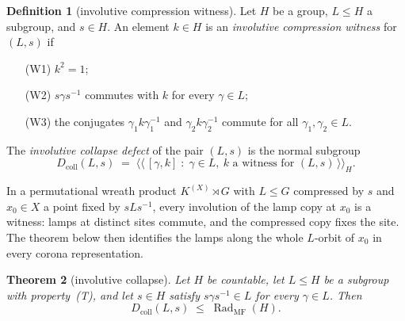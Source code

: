 \documentclass[11pt]{amsart}
\newcommand{\leanverified}[2]{\ignorespaces}
\newtheorem{theorem}{Theorem}[section]
\theoremstyle{definition}
\newtheorem{definition}[theorem]{Definition}
\theoremstyle{remark}
\theoremstyle{plain}
\begin{document}
\begin{definition}[involutive compression witness]\label{def:invwitness}
Let $H$ be a group, $L\le H$ a subgroup, and $s\in H$.  An element
$k\in H$ is an \emph{involutive compression witness} for $(L,s)$ if
\begin{enumerate}
\item[(W1)] $k^2=1$;
\item[(W2)] $s\gamma s^{-1}$ commutes with $k$ for every $\gamma\in L$;
\item[(W3)] the conjugates $\gamma_1k\gamma_1^{-1}$ and
  $\gamma_2k\gamma_2^{-1}$ commute for all $\gamma_1,\gamma_2\in L$.
\end{enumerate}
The \emph{involutive collapse defect} of the pair $(L,s)$ is the
normal subgroup
\leanverified{Sofic/ManuscriptExactWrappers}{GroupApproximation.ManuscriptExactWrappers.manuscriptInvolutiveCollapsePattern}
\[
  D_{\mathrm{coll}}(L,s)
  \;=\;
  \bigl\langle\!\bigl\langle\,
  [\gamma,k]\;:\;\gamma\in L,\
  k\text{ a witness for }(L,s)
  \,\bigr\rangle\!\bigr\rangle_H .
\]
\end{definition}

In a permutational wreath product $K^{(X)}\rtimes G$ with $L\le G$
compressed by $s$ and $x_0\in X$ a point fixed by $sLs^{-1}$, every
involution of the lamp copy at $x_0$ is a witness: lamps at distinct
sites commute, and the compressed copy fixes the site.  The theorem
below then identifies the lamps along the whole $L$-orbit of $x_0$ in
every corona representation.

\begin{theorem}[involutive collapse]\label{thm:collapse}
Let $H$ be countable, let $L\le H$ be a subgroup with
property~\textup{(T)}, and let $s\in H$ satisfy
$s\gamma s^{-1}\in L$ for every $\gamma\in L$.  Then
\leanverified{Sofic/ManuscriptExactWrappers}{GroupApproximation.ManuscriptExactWrappers.manuscriptInvolutiveCollapse}
\[
  D_{\mathrm{coll}}(L,s)\;\le\;\operatorname{Rad}_{\mathrm{MF}}(H).
\]
\end{theorem}
\end{document}
